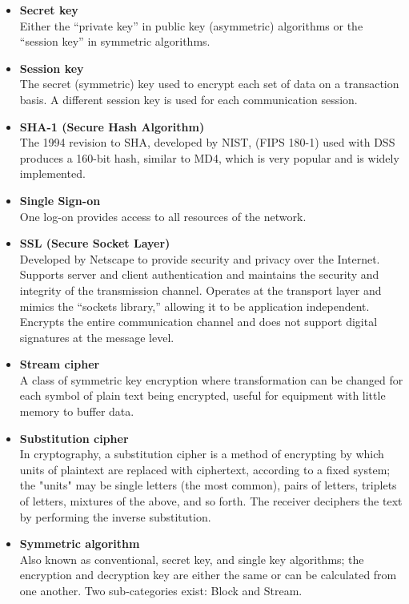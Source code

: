 \begin{itemize}
\item \textbf{Secret key}\\
Either the “private key” in public key (asymmetric) algorithms or the “session key” in symmetric algorithms.

\item \textbf{Session key}\\
The secret (symmetric) key used to encrypt each set of data on a transaction basis. A different session key is used for each communication session.

\item \textbf{SHA-1 (Secure Hash Algorithm)}\\
The 1994 revision to SHA, developed by NIST, (FIPS 180-1) used with DSS produces a 160-bit hash, similar to MD4, which is very popular and is widely implemented.

\item \textbf{Single Sign-on}\\
One log-on provides access to all resources of the network.

\item \textbf{SSL (Secure Socket Layer)}\\
Developed by Netscape to provide security and privacy over the Internet. Supports server and client authentication and maintains the security and integrity of the transmission channel. Operates at the transport layer and mimics the “sockets library,” allowing it to be application independent. Encrypts the entire communication channel and does not support digital signatures at the message level.

\item \textbf{Stream cipher}\\
A class of symmetric key encryption where transformation can be changed for each symbol of plain text being encrypted, useful for equipment with little memory to buffer data.

\item \textbf{Substitution cipher}\\
In cryptography, a substitution cipher is a method of encrypting by which units of plaintext are replaced with ciphertext, according to a fixed system; the "units" may be single letters (the most common), pairs of letters, triplets of letters, mixtures of the above, and so forth. The receiver deciphers the text by performing the inverse substitution.\cite{wiki:subcipher}

\item  \textbf{Symmetric algorithm}\\
Also known as conventional, secret key, and single key algorithms; the encryption and decryption key are either the same or can be calculated from one another. Two sub-categories exist: Block and Stream.


\end{itemize}

